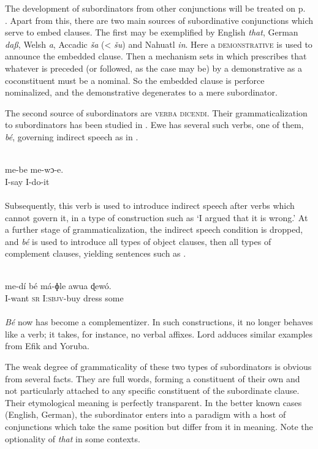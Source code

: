 The development of subordinators from other conjunctions will be treated on p.~\pageref{page70}\chk%
 . Apart from this, there are two main sources of subordinative conjunctions which serve to embed clauses. The first may be exemplified by English \textit{that}, German \textit{daß}, Welsh \textit{a}, Accadic \textit{ša} ({\textless} \textit{šu}) and Nahuatl \textit{in}. Here a \textsc{demonstrative} is used to announce the embedded clause. Then a mechanism sets in which prescribes that whatever is preceded (or followed, as the case may be) by a demonstrative as a coconstituent must be a nominal. So the embedded clause is perforce nominalized, and the demonstrative degenerates to a mere subordinator.

The second source of subordinators are \textsc{verba dicendi}. Their grammaticalization to subordinators has been studied in \citet{Lord1976}. Ewe has several such verbs, one of them, \textit{bé}, governing indirect speech as in .

\ea\label{ex:E26}
\\
\gll me-be 
 me-wɔ-e.\\
 I-say  I-do-it\\
\\
\z
\noindent Subsequently, this verb is used to introduce indirect speech after verbs which cannot govern it, in a type of construction such as ‘I argued that it is wrong.’ At a further stage of grammaticalization, the indirect speech condition is dropped, and \textit{bé} is used to introduce all types of object clauses, then all types of complement clauses, yielding sentences such as .

\ea\label{ex:E27}
\\
\gll me-dí  bé  má-ɸle  awua  ɖewó.\\
 I-want  \textsc{sr}  I:\textsc{sbjv}-buy  dress  some\\
\\
\z
\noindent \textit{Bé} now has become a complementizer. In such constructions, it no longer behaves like a verb; it takes, for instance, no verbal affixes. Lord adduces similar examples from Efik and Yoruba.

The weak degree of grammaticality of these two types of subordinators is obvious from several facts. They are full words, forming a constituent of their own and not particularly attached to any specific constituent of the subordinate clause. Their etymological meaning is perfectly transparent. In the better known cases (English, German), the subordinator enters into a paradigm with a host of conjunctions which take the same position but differ from it in meaning. Note the optionality of \textit{that} in some contexts.

